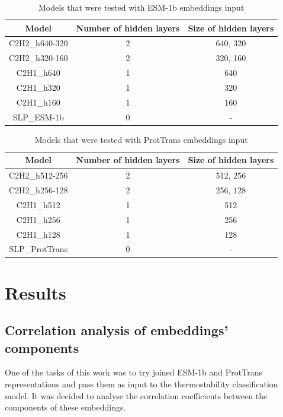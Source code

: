 \documentclass[12pt]{article}
\begin{document}
	\begin{table}[h!]
		\caption{Models that were tested with ESM-1b embeddings input}
		\vspace{0.2cm}
		\centering
		\begin{tabular}{ | c | c c | }
			\hline 
			Model & Number of hidden layers & Size of hidden layers \\
			\hline 
			C2H2\_h640-320 & 2 & 640, 320 \\
			C2H2\_h320-160 & 2 & 320, 160 \\
			C2H1\_h640 & 1 & 640 \\
			C2H1\_h320 & 1 & 320 \\
			C2H1\_h160 & 1 & 160 \\
			SLP\_ESM-1b & 0 & - \\
			\hline    
		\end{tabular}
		\label{table:modelArchitecturesESM}
	\end{table}

	\begin{table}[h!]
		\caption{Models that were tested with ProtTrans embeddings input}
		\vspace{0.2cm}
		\centering
		\begin{tabular}{ | c | c c | }
			\hline 
			Model & Number of hidden layers & Size of hidden layers \\
			\hline 
			C2H2\_h512-256 & 2 & 512, 256 \\
			C2H2\_h256-128 & 2 & 256, 128 \\
			C2H1\_h512 & 1 & 512 \\
			C2H1\_h256 & 1 & 256 \\
			C2H1\_h128 & 1 & 128 \\
			SLP\_ProtTrans & 0 & - \\
			\hline    
		\end{tabular}
		\label{table:modelArchitecturesPT}
	\end{table}

	\newpage

	\section{Results}

	\subsection{Correlation analysis of embeddings' components}

	One of the tasks of this work was to try joined ESM-1b and ProtTrans 
	representations and pass them as input to the thermostability 
	classification model. It was decided to analyse the correlation 
	coefficients between the components of these embeddings. 
\end{document}
